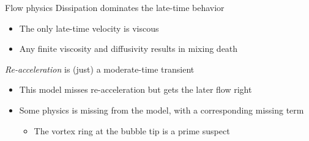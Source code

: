\documentclass[12pt]{beamer}
\begin{document}
\begin{frame}{Flow physics}
Dissipation dominates the late-time behavior
\begin{itemize}
  \item The only late-time velocity is viscous
  \item Any finite viscosity and diffusivity results in mixing death
\end{itemize}

\textit{Re-acceleration} is (just) a moderate-time transient
\begin{itemize}
  \item This model misses re-acceleration but gets the later flow right
  \item Some physics is missing from the model, with a corresponding missing term
  \begin{itemize}
    \item The vortex ring at the bubble tip is a prime suspect
  \end{itemize}
\end{itemize}
\end{frame}
\end{document}
